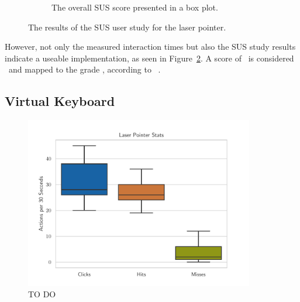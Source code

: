 \begin{figure}[H]
\begin{subfigure}{.45\textwidth}
    \caption{The overall \ac{SUS} score presented in a box plot.}\label{fig:score-exp-lp}
  \end{subfigure}%
  \caption[User study results of the laser pointer experiment]{The results of the \ac{SUS} user study for the laser pointer.}\label{fig:exp-lp-stats}
\end{figure}

However, not only the measured interaction times but also the \ac{SUS} study results indicate a useable implementation, as seen in Figure~\ref{fig:exp-lp-stats}. A score of \evalExpLpSusScore\ is considered \evalExpLpSusAdj\ and mapped to the grade \evalExpLpSusGrade, according to \citeauthor{Bangor.2009}~\cite{Bangor.2009}.



\subsection{Virtual Keyboard}\label{section:eval-res-vk}


\begin{figure}[H]
  \centering
  \includegraphics[width=10cm]{figures/evaluation/eval_exp_lp.pdf}
  \caption[TO DO]{TO DO}\label{fig:eval-exp-vk}
\end{figure}


